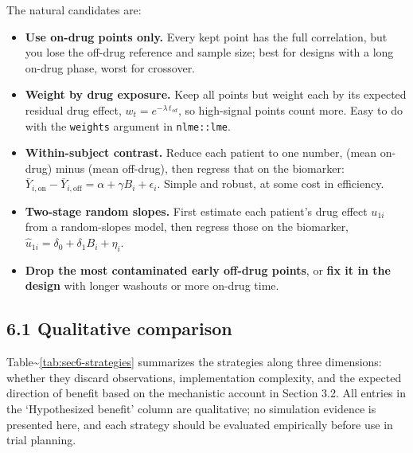 \documentclass[
  11pt,
]{article}
\begin{document}
The natural candidates are:

\begin{itemize}
\item \textbf{Use on-drug points only.} Every kept point has the full
  correlation, but you lose the off-drug reference and sample size;
  best for designs with a long on-drug phase, worst for crossover.
\item \textbf{Weight by drug exposure.} Keep all points but weight each
  by its expected residual drug effect, $w_t = e^{-\lambda\,
  t_{sd}}$, so high-signal points count more. Easy to do with the
  \texttt{weights} argument in \texttt{nlme::lme}.
\item \textbf{Within-subject contrast.} Reduce each patient to one
  number, (mean on-drug) minus (mean off-drug), then regress that
  on the biomarker: $\bar Y_{i,\text{on}} - \bar Y_{i,\text{off}} =
  \alpha + \gamma B_i + \epsilon_i$. Simple and robust, at some
  cost in efficiency.
\item \textbf{Two-stage random slopes.} First estimate each patient's
  drug effect $u_{1i}$ from a random-slopes model, then regress
  those on the biomarker, $\hat u_{1i} = \delta_0 + \delta_1 B_i +
  \eta_i$.
\item \textbf{Drop the most contaminated early off-drug points}, or
  \textbf{fix it in the design} with longer washouts or more on-drug
  time.
\end{itemize}

\subsection{6.1 Qualitative comparison}

Table\textasciitilde{}\ref{tab:sec6-strategies} summarizes the
strategies along three dimensions: whether they discard observations,
implementation complexity, and the expected direction of benefit based
on the mechanistic account in Section 3.2. All entries in the
`Hypothesized benefit' column are qualitative; no simulation evidence is
presented here, and each strategy should be evaluated empirically before
use in trial planning.
\end{document}
